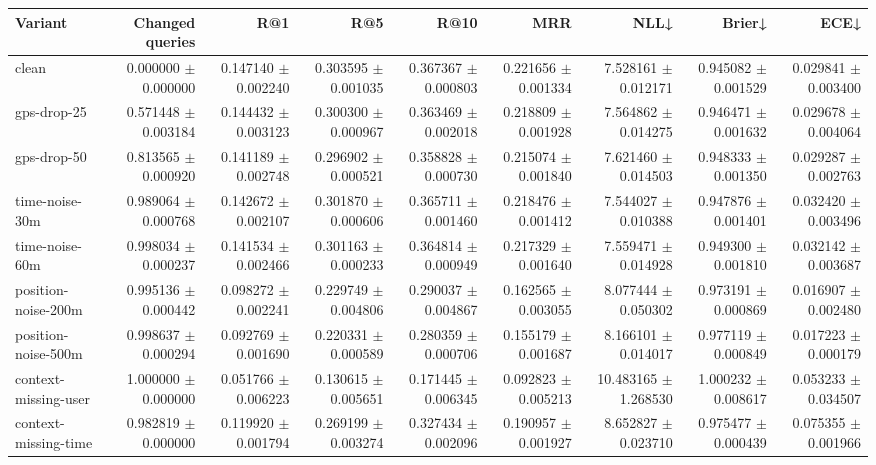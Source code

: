 \begin{table}[!htbp]
\centering
\scriptsize
\setlength{\tabcolsep}{2.5pt}
\begin{adjustbox}{max width=\textwidth}
\begin{tabular}{@{}lrrrrrrrr@{}}
\toprule
Variant & Changed queries & R@1 & R@5 & R@10 & MRR & NLL↓ & Brier↓ & ECE↓ \\
\midrule
clean & 0.000000 $\pm$ 0.000000 & 0.147140 $\pm$ 0.002240 & 0.303595 $\pm$ 0.001035 & 0.367367 $\pm$ 0.000803 & 0.221656 $\pm$ 0.001334 & 7.528161 $\pm$ 0.012171 & 0.945082 $\pm$ 0.001529 & 0.029841 $\pm$ 0.003400 \\
gps-drop-25 & 0.571448 $\pm$ 0.003184 & 0.144432 $\pm$ 0.003123 & 0.300300 $\pm$ 0.000967 & 0.363469 $\pm$ 0.002018 & 0.218809 $\pm$ 0.001928 & 7.564862 $\pm$ 0.014275 & 0.946471 $\pm$ 0.001632 & 0.029678 $\pm$ 0.004064 \\
gps-drop-50 & 0.813565 $\pm$ 0.000920 & 0.141189 $\pm$ 0.002748 & 0.296902 $\pm$ 0.000521 & 0.358828 $\pm$ 0.000730 & 0.215074 $\pm$ 0.001840 & 7.621460 $\pm$ 0.014503 & 0.948333 $\pm$ 0.001350 & 0.029287 $\pm$ 0.002763 \\
time-noise-30m & 0.989064 $\pm$ 0.000768 & 0.142672 $\pm$ 0.002107 & 0.301870 $\pm$ 0.000606 & 0.365711 $\pm$ 0.001460 & 0.218476 $\pm$ 0.001412 & 7.544027 $\pm$ 0.010388 & 0.947876 $\pm$ 0.001401 & 0.032420 $\pm$ 0.003496 \\
time-noise-60m & 0.998034 $\pm$ 0.000237 & 0.141534 $\pm$ 0.002466 & 0.301163 $\pm$ 0.000233 & 0.364814 $\pm$ 0.000949 & 0.217329 $\pm$ 0.001640 & 7.559471 $\pm$ 0.014928 & 0.949300 $\pm$ 0.001810 & 0.032142 $\pm$ 0.003687 \\
position-noise-200m & 0.995136 $\pm$ 0.000442 & 0.098272 $\pm$ 0.002241 & 0.229749 $\pm$ 0.004806 & 0.290037 $\pm$ 0.004867 & 0.162565 $\pm$ 0.003055 & 8.077444 $\pm$ 0.050302 & 0.973191 $\pm$ 0.000869 & 0.016907 $\pm$ 0.002480 \\
position-noise-500m & 0.998637 $\pm$ 0.000294 & 0.092769 $\pm$ 0.001690 & 0.220331 $\pm$ 0.000589 & 0.280359 $\pm$ 0.000706 & 0.155179 $\pm$ 0.001687 & 8.166101 $\pm$ 0.014017 & 0.977119 $\pm$ 0.000849 & 0.017223 $\pm$ 0.000179 \\
context-missing-user & 1.000000 $\pm$ 0.000000 & 0.051766 $\pm$ 0.006223 & 0.130615 $\pm$ 0.005651 & 0.171445 $\pm$ 0.006345 & 0.092823 $\pm$ 0.005213 & 10.483165 $\pm$ 1.268530 & 1.000232 $\pm$ 0.008617 & 0.053233 $\pm$ 0.034507 \\
context-missing-time & 0.982819 $\pm$ 0.000000 & 0.119920 $\pm$ 0.001794 & 0.269199 $\pm$ 0.003274 & 0.327434 $\pm$ 0.002096 & 0.190957 $\pm$ 0.001927 & 8.652827 $\pm$ 0.023710 & 0.975477 $\pm$ 0.000439 & 0.075355 $\pm$ 0.001966 \\

\end{tabular}
\end{adjustbox}
\end{table}
